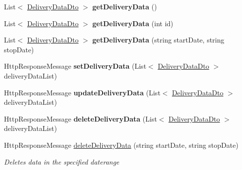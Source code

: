 \begin{DoxyCompactItemize}
List$<$ \hyperlink{classkpi_mvc_api_1_1_data_transfer_objects_1_1_delivery_data_dto}{Delivery\+Data\+Dto} $>$ {\bfseries get\+Delivery\+Data} ()
\item 
\mbox{\label{classkpi_mvc_api_1_1_controllers_1_1_kpidata_controller_a63c0c7c25b53904dbae7786dd66285e4}} 
List$<$ \hyperlink{classkpi_mvc_api_1_1_data_transfer_objects_1_1_delivery_data_dto}{Delivery\+Data\+Dto} $>$ {\bfseries get\+Delivery\+Data} (int id)
\item 
\mbox{\label{classkpi_mvc_api_1_1_controllers_1_1_kpidata_controller_aa080da542869888b3e45666e7e751b72}} 
List$<$ \hyperlink{classkpi_mvc_api_1_1_data_transfer_objects_1_1_delivery_data_dto}{Delivery\+Data\+Dto} $>$ {\bfseries get\+Delivery\+Data} (string start\+Date, string stop\+Date)
\item 
\mbox{\label{classkpi_mvc_api_1_1_controllers_1_1_kpidata_controller_ae0c16d6b3d009224eae6ea5a2b20aabd}} 
Http\+Response\+Message {\bfseries set\+Delivery\+Data} (List$<$ \hyperlink{classkpi_mvc_api_1_1_data_transfer_objects_1_1_delivery_data_dto}{Delivery\+Data\+Dto} $>$ delivery\+Data\+List)
\item 
\mbox{\label{classkpi_mvc_api_1_1_controllers_1_1_kpidata_controller_a893e7ff73b6dbd31afa5e1aa73e5abae}} 
Http\+Response\+Message {\bfseries update\+Delivery\+Data} (List$<$ \hyperlink{classkpi_mvc_api_1_1_data_transfer_objects_1_1_delivery_data_dto}{Delivery\+Data\+Dto} $>$ delivery\+Data\+List)
\item 
\mbox{\label{classkpi_mvc_api_1_1_controllers_1_1_kpidata_controller_a2494970082b1b00fd50353e4aa840188}} 
Http\+Response\+Message {\bfseries delete\+Delivery\+Data} (List$<$ \hyperlink{classkpi_mvc_api_1_1_data_transfer_objects_1_1_delivery_data_dto}{Delivery\+Data\+Dto} $>$ delivery\+Data\+List)
\item 
Http\+Response\+Message \hyperlink{classkpi_mvc_api_1_1_controllers_1_1_kpidata_controller_afa78742271a206304b8daa11cb747bde}{delete\+Delivery\+Data} (string start\+Date, string stop\+Date)
\begin{DoxyCompactList}\small\item\em Deletes data in the specified daterange \end{DoxyCompactList}\end{DoxyCompactItemize}


